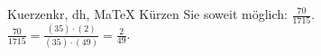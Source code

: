 \begin{MAufgabe}{Kuerzen}{kr, dh, MaTeX}
K\"urzen Sie soweit m\"oglich: $\frac{70}{1715}$.\\ 
\ifLsg\MLoesung
\quad $\frac{70}{1715}=\frac{(35)\cdot(2)}{(35)\cdot(49)}=\frac{2}{49}$.\else\relax\fi
 \end{MAufgabe}
